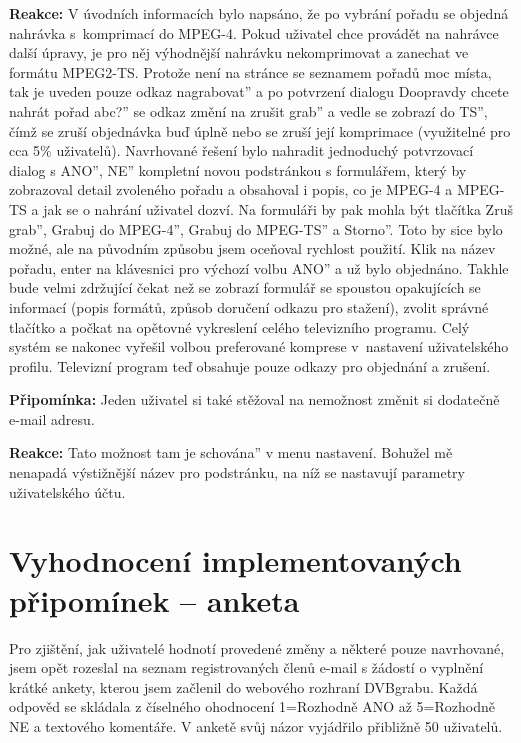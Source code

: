 \textbf{Reakce:} V úvodních informacích bylo napsáno, že po vybrání pořadu se objedná nahrávka s~komprimací do MPEG-4. Pokud uživatel chce provádět na nahrávce další úpravy, je pro něj výhodnější nahrávku nekomprimovat a zanechat ve formátu MPEG2-TS. Protože není na stránce se seznamem pořadů moc místa, tak je uveden pouze odkaz \quotedblbase nagrabovat'' a po potvrzení dialogu \quotedblbase Doopravdy chcete nahrát pořad abc?'' se odkaz změní na \quotedblbase zrušit grab'' a vedle se zobrazí \linebreak[4]\quotedblbase do TS'', čímž se zruší objednávka buď úplně nebo se zruší její komprimace (využitelné pro cca 5\% uživatelů). Navrhované řešení bylo nahradit jednoduchý potvrzovací dialog s \quotedblbase ANO'', \quotedblbase NE'' kompletní novou podstránkou s formulářem, který by zobrazoval detail zvoleného pořadu a obsahoval i popis, co je MPEG-4 a MPEG-TS a jak se o nahrání uživatel dozví. Na formuláři by pak mohla být tlačítka \quotedblbase Zruš grab'', \quotedblbase Grabuj do MPEG-4'', \quotedblbase Grabuj do MPEG-TS'' a \quotedblbase Storno''. Toto by sice bylo možné, ale na původním způsobu jsem oceňoval rychlost použití. Klik na název pořadu, enter na klávesnici pro výchozí volbu \quotedblbase ANO'' a už bylo objednáno. Takhle bude velmi zdržující čekat než se zobrazí formulář se spoustou opakujících se informací (popis formátů, způsob doručení odkazu pro stažení), zvolit správné tlačítko a počkat na opětovné vykreslení celého televizního programu. Celý systém se nakonec vyřešil volbou preferované komprese v~nastavení uživatelského profilu. Televizní program teď obsahuje pouze odkazy pro objednání a zrušení.

\bigskip

\textbf{Připomínka:} Jeden uživatel si také stěžoval na nemožnost změnit si dodatečně e-mail adresu.

\textbf{Reakce:} Tato možnost tam je \quotedblbase schována'' v menu nastavení. Bohužel mě nenapadá výstižnější název pro podstránku, na níž se nastavují parametry uživatelského účtu.

\bigskip

\section{Vyhodnocení implementovaných připomínek -- anketa}

Pro zjištění, jak uživatelé hodnotí provedené změny a některé pouze navrhované, jsem opět rozeslal na seznam registrovaných členů e-mail s žádostí o vyplnění krátké ankety, kterou jsem začlenil do webového rozhraní DVBgrabu. Každá odpověd se skládala z číselného ohodnocení 1=Rozhodně ANO až 5=Rozhodně NE a textového komentáře. V anketě svůj názor vyjádřilo přibližně 50 uživatelů.


